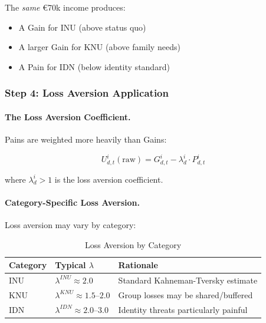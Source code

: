 The \emph{same} \euro{70k} income produces:
\begin{itemize}
\item A Gain for INU (above status quo)
\item A larger Gain for KNU (above family needs)
\item A Pain for IDN (below identity standard)
\end{itemize}

\subsubsection{Step 4: Loss Aversion Application}

\paragraph{The Loss Aversion Coefficient.}
Pains are weighted more heavily than Gains:

\begin{equation}
U^i_{d,t}(\text{raw}) = G^i_{d,t} - \lambda^i_d \cdot P^i_{d,t}
\label{eq:raw-utility}
\end{equation}

where $\lambda^i_d > 1$ is the loss aversion coefficient.

\paragraph{Category-Specific Loss Aversion.}
Loss aversion may vary by category:

\begin{table}[htbp]
\centering
\caption{Loss Aversion by Category}
\label{tab:lambda-by-category}
\renewcommand{\arraystretch}{1.3}
\begin{tabular}{@{}lll@{}}
\toprule
\textbf{Category} & \textbf{Typical $\lambda$} & \textbf{Rationale} \\
\midrule
INU & $\lambda^{INU} \approx 2.0$ & Standard Kahneman-Tversky estimate \\
KNU & $\lambda^{KNU} \approx 1.5$--$2.0$ & Group losses may be shared/buffered \\
IDN & $\lambda^{IDN} \approx 2.0$--$3.0$ & Identity threats particularly painful \\
\bottomrule
\end{tabular}
\end{table}

